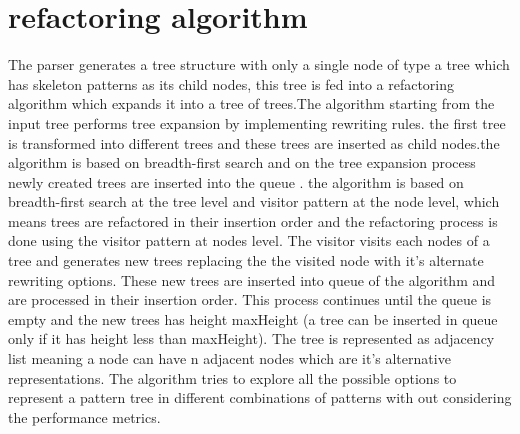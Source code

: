 \documentclass[12pt]{report}
\begin{document}
\section{refactoring algorithm}
The parser generates a tree structure with only a single node of type a tree which has skeleton patterns as its child nodes, this tree is fed into a refactoring algorithm which expands it into a tree of trees.The algorithm starting from the input tree performs tree expansion by implementing rewriting rules. the first tree is transformed into different trees and these trees are inserted as child nodes.the algorithm is based on breadth-first search and on the tree expansion process newly created trees are inserted into the queue . the algorithm is based on breadth-first search at the tree level and visitor pattern at the node level, which means trees are refactored in their insertion order and the refactoring process is done using the visitor pattern at nodes level. 
The visitor visits each nodes of a tree and generates new trees replacing the the visited node with it's alternate rewriting options. These new trees are inserted into queue of the algorithm and are processed in their insertion order. This process continues until the queue is empty and the new trees has height maxHeight (a tree can be inserted in queue only if it has height less than maxHeight). The tree is represented as adjacency list meaning a node can have n adjacent nodes which are it's alternative representations. The algorithm tries to explore all the possible options to represent a pattern tree in different combinations of patterns with out considering the performance metrics. 
\end{document}
